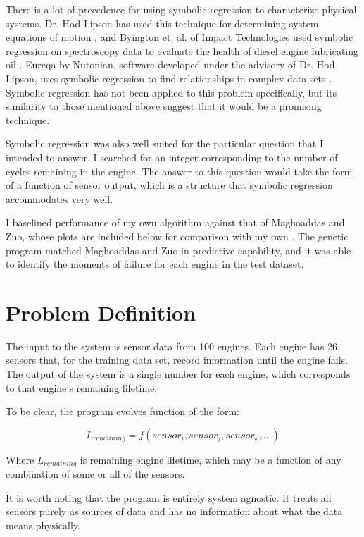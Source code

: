 \documentclass{acm_proc_article-sp}
\begin{document}
There is a lot of precedence for using symbolic regression to characterize physical systems. Dr. Hod Lipson has used this technique for determining system equations of motion \cite{symbolic}, and Byington et. al. of Impact Technologies used symbolic regression on spectroscopy data to evaluate the health of diesel engine lubricating oil \cite{oil}. Eureqa by Nutonian, software developed under the advisory of Dr. Hod Lipson, uses symbolic regression to find relationships in complex data sets \cite{nutonian}. Symbolic regression has not been applied to this problem specifically, but its similarity to those mentioned above suggest that it would be a promising technique. 

Symbolic regression was also well suited for the particular question that I intended to answer.  I searched for an integer corresponding to the number of cycles remaining in the engine. The answer to this question would take the form of a function of sensor output, which is a structure that symbolic regression accommodates very well.


I baselined performance of my own algorithm against that of Maghoaddas and Zuo, whose plots are included below for comparison with my own \cite{Mog}. The genetic program matched Maghoaddas and Zuo in predictive capability, and it was able to identify the moments of failure for each engine in the test dataset.


\section{Problem Definition}
The input to the system is sensor data from 100 engines. Each engine has 26 sensors that, for the training data set, record information until the engine fails. The output of the system is a single number for each engine, which corresponds to that engine's remaining lifetime.


To be clear, the program evolves function of the form:

\begin{equation}
L_{remaining} = f (sensor_{i}, sensor_{j}, sensor_{k}, \dots )
\end{equation}

Where $L_{remaining}$ is remaining engine lifetime, which may be a function of any combination of some or all of the sensors.

It is worth noting that the program is entirely system agnostic. It treats all sensors purely as sources of data and has no information about what the data means physically.
\end{document}
